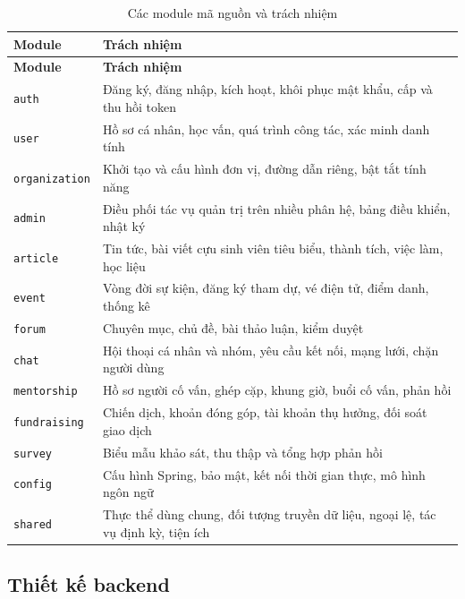 \documentclass[12pt,a4paper,oneside]{report}
\begin{document}
\renewcommand{\arraystretch}{1.2}
\begin{longtable}{|>{\raggedright\arraybackslash}p{3.0cm}|>{\raggedright\arraybackslash}p{11.5cm}|}
\caption{Các module mã nguồn và trách nhiệm}\label{tab:packages}\\
\hline \textbf{Module} & \textbf{Trách nhiệm} \\ \hline
\endfirsthead
\hline \textbf{Module} & \textbf{Trách nhiệm} \\ \hline
\endhead
\texttt{auth} & Đăng ký, đăng nhập, kích hoạt, khôi phục mật khẩu, cấp và thu hồi token \\ \hline
\texttt{user} & Hồ sơ cá nhân, học vấn, quá trình công tác, xác minh danh tính \\ \hline
\texttt{organization} & Khởi tạo và cấu hình đơn vị, đường dẫn riêng, bật tắt tính năng \\ \hline
\texttt{admin} & Điều phối tác vụ quản trị trên nhiều phân hệ, bảng điều khiển, nhật ký \\ \hline
\texttt{article} & Tin tức, bài viết cựu sinh viên tiêu biểu, thành tích, việc làm, học liệu \\ \hline
\texttt{event} & Vòng đời sự kiện, đăng ký tham dự, vé điện tử, điểm danh, thống kê \\ \hline
\texttt{forum} & Chuyên mục, chủ đề, bài thảo luận, kiểm duyệt \\ \hline
\texttt{chat} & Hội thoại cá nhân và nhóm, yêu cầu kết nối, mạng lưới, chặn người dùng \\ \hline
\texttt{mentorship} & Hồ sơ người cố vấn, ghép cặp, khung giờ, buổi cố vấn, phản hồi \\ \hline
\texttt{fundraising} & Chiến dịch, khoản đóng góp, tài khoản thụ hưởng, đối soát giao dịch \\ \hline
\texttt{survey} & Biểu mẫu khảo sát, thu thập và tổng hợp phản hồi \\ \hline
\texttt{config} & Cấu hình Spring, bảo mật, kết nối thời gian thực, mô hình ngôn ngữ \\ \hline
\texttt{shared} & Thực thể dùng chung, đối tượng truyền dữ liệu, ngoại lệ, tác vụ định kỳ, tiện ích \\ \hline
\end{longtable}
\renewcommand{\arraystretch}{1}

\subsection{Thiết kế backend}
\end{document}
